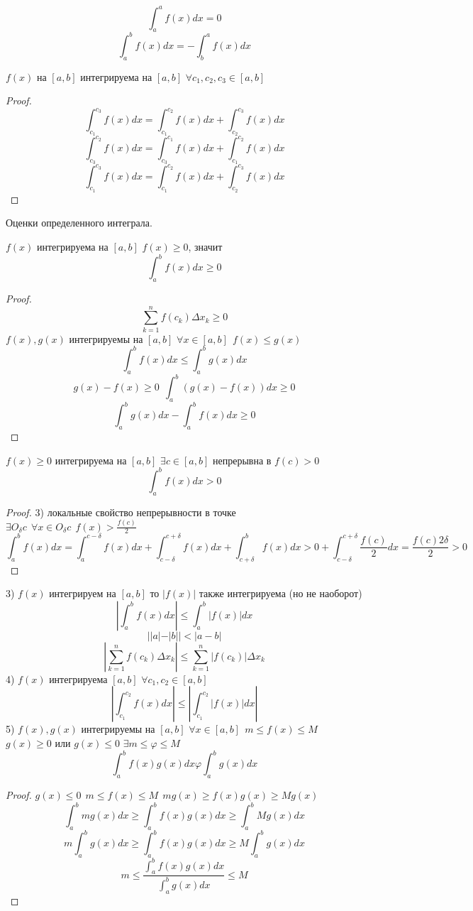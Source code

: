 \[
    \int_a^a f(x)dx = 0
\]
\[
    \int_a^b f(x)dx = - \int_b^a f(x)dx
\]

 $f(x)$ на $[a, b]$ интегрируема на $[a, b]$ $\forall c_1, c_2, c_3
                                                                \in [a, b]$

\begin{proof}
    \[
    \int_{c_1}^{c_3} f(x)dx = \int_{c_1}^{c_2} f(x)dx + \int_{c_2}^{c_3} f(x)dx
    \]
    \[
        \int_{c_3}^{c_2} f(x)dx = \int_{c_3}^{c_1}f(x)dx +
        \int_{c_1}^{c_2}f(x)dx
    \]
    \[
        \int_{c_1}^{c_3} f(x)dx = \int_{c_1}^{c_2}f(x)dx +
        \int_{c_2}^{c_3}f(x)dx
    \]
\end{proof}

\begin{title}[\Large]
    Оценки определенного интеграла.
\end{title}
 $f(x)$ интегрируема на $[a, b]$ $f(x) \ge 0$, значит
\[\int_a^b f(x)dx \ge 0\]
\begin{proof}
    \[\sum_{k=1}^{n} f(c_k)\Delta x_k \ge 0\]
    $f(x), g(x)$ интегрируемы на $[a, b]$ $\forall x \in [a, b] ~~ f(x)\le g(x)$
    \[\int_a^b f(x)dx \le \int_a^b g(x)dx\]
    \[g(x) - f(x) \ge 0 ~~ \int_a^b (g(x) - f(x))dx \ge 0\]
    \[\int_a^b g(x)dx - \int_a^b f(x)dx \ge 0\]
\end{proof}

 $f(x) \ge 0$ интегрируема на $[a, b]$ $\exists c \in [a, b]$ непрерывна в
$f(c) > 0$ \[\int_a^b f(x)dx > 0\]
\begin{proof}
    3) локальные свойство непрерывности в точке $\exists O_{\delta}c ~~
    \forall x \in O_{\delta}c ~~ f(x) > \frac{f(c)}{2}$
    \[
        \int_a^b f(x)dx = \int_a^{c-\delta} f(x)dx +
        \int_{c-\delta}^{c+\delta} f(x)dx + \int_{c+\delta}^b f(x)dx >
        0 + \int_{c-\delta}^{c+\delta} \frac{f(c)}{2}dx
        = \frac{f(c) 2\delta}{2} > 0
    \]
\end{proof}
3) $f(x)$ интегрируем на $[a, b]$ то $|f(x)|$ также интегрируема
(но не наоборот)
\[\left| \int_a^b f(x)dx \right| \le \int_a^b |f(x)|dx\]
\[||a| - |b|| < |a - b|\]
\[
    \left| \sum_{k=1}^n f(c_k)\Delta x_k \right| \le
    \sum_{k=1}^{n}|f(c_k)|\Delta x_k
\]
4) $f(x)$ интегрируема $[a, b]$ $\forall c_1, c_2 \in [a, b]$
\[
    \left| \int_{c_1}^{c_2} f(x)dx \right| \le
    \left| \int_{c_1}^{c_2} |f(x)|dx \right|
\]
5) $f(x), g(x)$ интегрируемы на $[a, b]$ $\forall x \in [a, b] ~~
m \le f(x) \le M$ $g(x) \ge 0$ или $g(x) \le 0$ $\exists m \le \varphi \le M$
\[\int_a^b f(x)g(x)dx \varphi \int_a^b g(x)dx\]
\begin{proof}
    $g(x) \le 0 ~~ m \le f(x) \le M ~~ mg(x) \ge f(x)g(x) \ge Mg(x)$
    \[\int_a^b mg(x)dx \ge \int_a^b f(x)g(x)dx \ge \int_a^b Mg(x)dx\]
    \[m\int_a^b g(x)dx \ge \int_a^b f(x)g(x)dx \ge M\int_a^b g(x)dx\]
    \[m \le \frac{\int_a^b f(x)g(x)dx}{\int_a^b g(x)dx} \le M\]
\end{proof}

